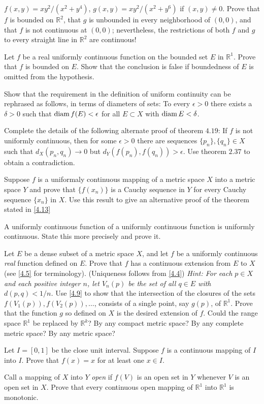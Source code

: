 \begin{exercise}
  \(f(x,y) = xy^2/(x^2 + y^4)\), \(g(x,y) = xy^2/(x^2 + y^6)\) if
  \((x,y)\neq 0\).
  Prove that \(f\) is bounded on \(\mathbb{R}^2\), that \(g\) is unbounded in
  every neighborhood of \((0,0)\), and that \(f\) is not continuous at
  \((0,0)\); nevertheless, the restrictions of both \(f\) and \(g\) to every
  straight line in \(\mathbb{R}^2\) are continuous!
\item
  Let \(f\) be a real uniformly continuous function on the bounded set \(E\) in
  \(\mathbb{R}^1\).
  Prove that \(f\) is bounded on \(E\).
  Show that the conclusion is false if boundedness of \(E\) is omitted from the
  hypothesis.
\item
  \label{4.9}
  Show that the requirement in the definition of uniform continuity can be
  rephrased as follows, in terms of diameters of sets: To every
  \(\epsilon > 0\) there exists a \(\delta > 0\) such that
  \(\operatorname{diam} f(E) < \epsilon\) for all \(E\subset X\) with \(\operatorname{diam} E < \delta\).
\item
  Complete the details of the following alternate  proof of theorem \(4.19\):
  If \(f\) is not uniformly continuous, then for some \(\epsilon > 0\) there
  are sequences \(\{p_n\},\{q_n\}\in X\) such that \(d_X(p_n,q_n)\to 0\) but
  \(d_Y(f(p_n),f(q_n)) > \epsilon\).
  Use theorem \(2.37\) to obtain a contradiction.
\item
  Suppose \(f\) is a uniformaly continuous mapping of a metric space \(X\)
  into a metric space \(Y\) and prove that \(\{f(x_n)\}\) is a Cauchy sequence
  in \(Y\) for every Cauchy sequence \(\{x_n\}\) in \(X\).
  Use this result to give an alternative proof of the theorem stated in
  \cref{4.13}
\item
  A uniformly continuous function of a uniformly continuous function is
  uniformly continuous.
  State this more precisely and prove it.
\item
  \label{4.13}
  Let \(E\) be a dense subset of a metric space \(X\), and let \(f\) be a
  uniformly continuous \textit{real} function defined on \(E\).
  Prove that \(f\) has a continuous extension from \(E\) to \(X\)
  (see \cref{4.5} for terminology).
  (Uniqueness follows from \cref{4.4})
  \textit{Hint: For each \(p\in X\) and each positive integer \(n\), let
    \(V_n(p)\) be the set of all \(q\in E\) with \(d(p,q) < 1/n\).}
  Use \cref{4.9} to show that the intersection of the closures of the sets
  \(f(V_1(p)),f(V_2(p)),\ldots\), consists of a single point, say \(g(p)\), of
  \(\mathbb{R}^1\).
  Prove that the function \(g\) so defined on \(X\) is the desired extension
  of \(f\).
  Could the range space \(\mathbb{R}^1\) be replaced by \(\mathbb{R}^k\)?
  By any compact metric space?
  By any complete metric space?
  By any metric space?
\item
  Let \(I = [0,1]\) be the close unit interval.
  Suppose \(f\) is a continuous mapping of \(I\) into \(I\).
  Prove that \(f(x) = x\) for at least one \(x\in I\).
\item
  Call a mapping of \(X\) into \(Y\) \textit{open} if \(f(V)\) is an open set
  in \(Y\) whenever \(V\) is an open set in \(X\).
  Prove that every continuous open mapping of \(\mathbb{R}^1\) into
  \(\mathbb{R}^1\) is monotonic.
\end{exercise}

